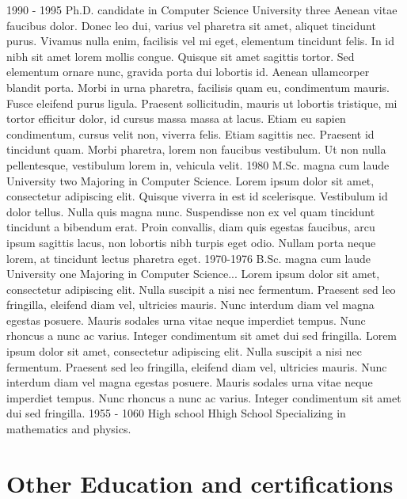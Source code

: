 \documentclass{article}
\begin{document}
{    \begin{twenty}
      \twentyitem
        {1990 - 1995}
        {Ph.D. {\normalfont candidate in Computer Science}}
        {University three}
        {Aenean vitae faucibus dolor. Donec leo dui, varius vel pharetra sit amet, aliquet tincidunt purus. Vivamus nulla enim, facilisis vel mi eget, elementum tincidunt felis. In id nibh sit amet lorem mollis congue. Quisque sit amet sagittis tortor. Sed elementum ornare nunc, gravida porta dui lobortis id. Aenean ullamcorper blandit porta. Morbi in urna pharetra, facilisis quam eu, condimentum mauris. Fusce eleifend purus ligula. Praesent sollicitudin, mauris ut lobortis tristique, mi tortor efficitur dolor, id cursus massa massa at lacus. Etiam eu sapien condimentum, cursus velit non, viverra felis. Etiam sagittis nec. Praesent id tincidunt quam. Morbi pharetra, lorem non faucibus vestibulum. Ut non nulla pellentesque, vestibulum lorem in, vehicula velit.}
      \twentyitem
        {1980}
        {M.Sc. magna cum laude}
        {University two}
        {Majoring in Computer Science. Lorem ipsum dolor sit amet, consectetur adipiscing elit. Quisque viverra in est id scelerisque. Vestibulum id dolor tellus. Nulla quis magna nunc. Suspendisse non ex vel quam tincidunt tincidunt a bibendum erat. Proin convallis, diam quis egestas faucibus, arcu ipsum sagittis lacus, non lobortis nibh turpis eget odio. Nullam porta neque lorem, at tincidunt lectus pharetra eget.}
      \twentyitem
        {1970-1976}
        {B.Sc. magna cum laude}
        {University one}
        {Majoring in Computer Science... Lorem ipsum dolor sit amet, consectetur adipiscing elit. Nulla suscipit a nisi nec fermentum. Praesent sed leo fringilla, eleifend diam vel, ultricies mauris. Nunc interdum diam vel magna egestas posuere. Mauris sodales urna vitae neque imperdiet tempus. Nunc rhoncus a nunc ac varius. Integer condimentum sit amet dui sed fringilla. Lorem ipsum dolor sit amet, consectetur adipiscing elit. Nulla suscipit a nisi nec fermentum. Praesent sed leo fringilla, eleifend diam vel, ultricies mauris. Nunc interdum diam vel magna egestas posuere. Mauris sodales urna vitae neque imperdiet tempus. Nunc rhoncus a nunc ac varius. Integer condimentum sit amet dui sed fringilla.}
      \twentyitem
        {1955 - 1060}
        {High school}
        {Hhigh School}
        {Specializing in mathematics and physics.}
    \end{twenty}
    
    \section{Other Education and certifications}
    
}
\end{document}
